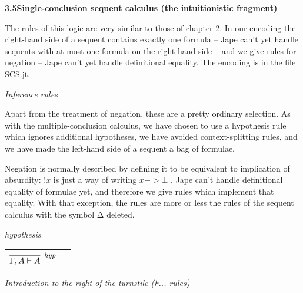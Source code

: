 \documentclass[11pt]{book}
\newcommand{\tab}{\hspace{5mm}}
\newcommand{\reason}[1]{\scalebox{0.85}{#1}}
\begin{document}
\textbf{{\large 3.5\tab Single-conclusion sequent calculus (the intuitionistic fragment)}}


The rules of this logic are very similar to those of chapter 2. In our encoding the right-hand side of a sequent contains exactly one formula -- Jape can't yet handle sequents with at most one formula on the right-hand side -- and we give rules for negation -- Jape can't yet handle definitional equality. The encoding is in the file SCS.jt.


\textit{Inference rules}


Apart from the treatment of negation, these are a pretty ordinary selection. As with the multiple-conclusion calculus, we have chosen to use a hypothesis rule which ignores additional hypotheses, we have avoided context-splitting rules, and we have made the left-hand side of a sequent a bag of formulae.


Negation is normally described by defining it to be equivalent to implication of absurdity: $!x$ is just a way of writing $x->\bot $ . Jape can't handle definitional equality of formulae yet, and therefore we give rules which implement that equality. With that exception, the rules are more or less the rules of the sequent calculus with the symbol Δ deleted.


\textit{hypothesis\\
}

\begin{tabular}{|p{1.028in}|p{0.069in}|}
\hline
{\raggedright 
$\infer[\reason{$hyp$}]
       {\Gamma,A |- A}
       {}$
}\\
\hline
\end{tabular}


\textit{Introduction to the right of the turnstile (⊦... rules)\\
}
\end{document}
